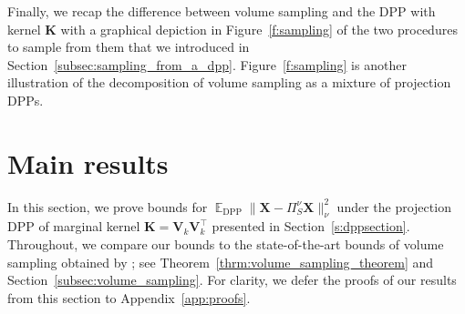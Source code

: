 \documentclass[twoside,11pt]{book}
\newtheorem{proposition}{Proposition}
\numberwithin{theorem}{chapter}
\numberwithin{definition}{chapter}
\numberwithin{proposition}{chapter}
\numberwithin{corollary}{chapter}
\numberwithin{example}{chapter}
\numberwithin{lemma}{chapter}
\DeclareMathOperator{\Det}{Det}
\DeclareMathOperator{\Fr}{\mathrm{Fr}}
\DeclareMathOperator{\DPP}{\mathrm{DPP}}
\DeclareMathOperator{\VS}{\mathrm{VS}}
\DeclareMathOperator{\Tran}{\intercal}
\DeclareMathOperator{\EX}{\mathbb{E}}
\DeclareMathOperator{\Prb}{\mathbb{P}}
\begin{document}
Finally, we recap the difference between volume sampling and the DPP with kernel $\bm K$ with a graphical depiction in Figure~\ref{f:sampling} of the two procedures to sample from them that we introduced in Section~\ref{subsec:sampling_from_a_dpp}. Figure~\ref{f:sampling} is another illustration of the decomposition of volume sampling as a mixture of projection DPPs.


\section{Main results}
In this section, we prove bounds for $\EX_{\DPP} \| \bm{X} - \Pi_{S}^{\nu}\bm{X} \|^2_{\nu}$ under the projection DPP of marginal kernel $\bm{K} = \bm{V}^{}_{k}\bm{V}^{\Tran}_{k}$ presented in Section~\ref{s:dppsection}. Throughout, we compare our bounds to the state-of-the-art bounds of volume sampling obtained by \cite{DRVW06}; see Theorem~\ref{thrm:volume_sampling_theorem} and Section~\ref{subsec:volume_sampling}. For clarity, we defer the proofs of our results from this section to Appendix~\ref{app:proofs}.

%

\end{document}
